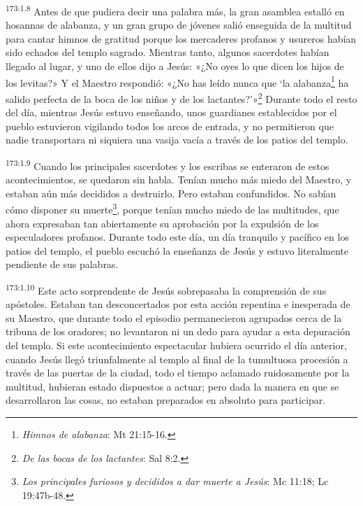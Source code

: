 \par 
\textsuperscript{173:1.8} Antes de que pudiera decir una palabra más, la gran asamblea estalló en hosannas de alabanza, y un gran grupo de jóvenes salió enseguida de la multitud para cantar himnos de gratitud porque los mercaderes profanos y usureros habían sido echados del templo sagrado. Mientras tanto, algunos sacerdotes habían llegado al lugar, y uno de ellos dijo a Jesús: «¿No oyes lo que dicen los hijos de los levitas?» Y el Maestro respondió: «¿No has leído nunca que `la alabanza\footnote{\textit{Himnos de alabanza}: Mt 21:15-16.} ha salido perfecta de la boca de los niños y de los lactantes?'»\footnote{\textit{De las bocas de los lactantes}: Sal 8:2.} Durante todo el resto del día, mientras Jesús estuvo enseñando, unos guardianes establecidos por el pueblo estuvieron vigilando todos los arcos de entrada, y no permitieron que nadie transportara ni siquiera una vasija vacía a través de los patios del templo.

\par 
\textsuperscript{173:1.9} Cuando los principales sacerdotes y los escribas se enteraron de estos acontecimientos, se quedaron sin habla. Tenían mucho más miedo del Maestro, y estaban aún más decididos a destruirlo. Pero estaban confundidos. No sabían cómo disponer su muerte\footnote{\textit{Los principales furiosos y decididos a dar muerte a Jesús}: Mc 11:18; Lc 19:47b-48.}, porque tenían mucho miedo de las multitudes, que ahora expresaban tan abiertamente su aprobación por la expulsión de los especuladores profanos. Durante todo este día, un día tranquilo y pacífico en los patios del templo, el pueblo escuchó la enseñanza de Jesús y estuvo literalmente pendiente de sus palabras.

\par 
\textsuperscript{173:1.10} Este acto sorprendente de Jesús sobrepasaba la comprensión de sus apóstoles. Estaban tan desconcertados por esta acción repentina e inesperada de su Maestro, que durante todo el episodio permanecieron agrupados cerca de la tribuna de los oradores; no levantaron ni un dedo para ayudar a esta depuración del templo. Si este acontecimiento espectacular hubiera ocurrido el día anterior, cuando Jesús llegó triunfalmente al templo al final de la tumultuosa procesión a través de las puertas de la ciudad, todo el tiempo aclamado ruidosamente por la multitud, hubieran estado dispuestos a actuar; pero dada la manera en que se desarrollaron las cosas, no estaban preparados en absoluto para participar.

